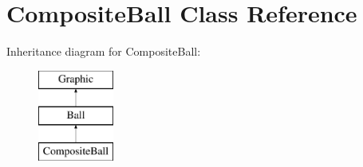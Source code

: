 \hypertarget{class_composite_ball}{}\section{Composite\+Ball Class Reference}
\label{class_composite_ball}
Inheritance diagram for Composite\+Ball\+:\begin{figure}[H]
\begin{center}
\leavevmode
\includegraphics[height=3.000000cm]{class_composite_ball}
\end{center}
\end{figure}
